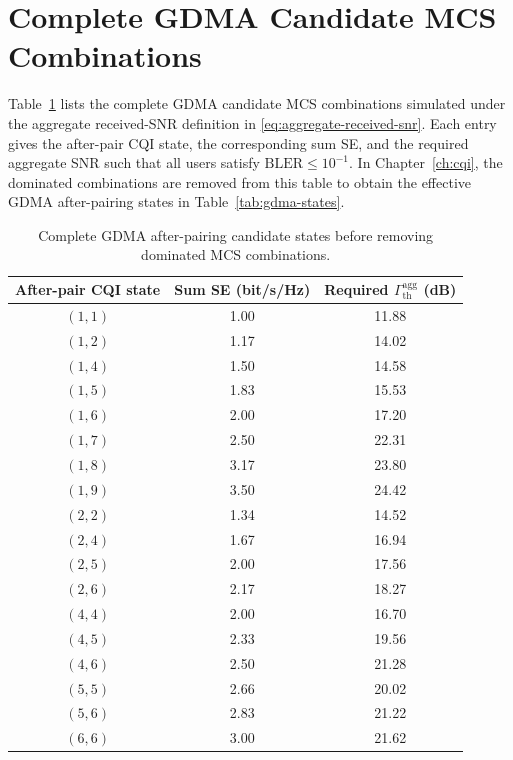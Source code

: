 
\makeatletter
\def\@currentlabel{A}
\makeatother
\label{app:gdma-candidate-table}

\section{Complete GDMA Candidate MCS Combinations}

Table~\ref{tab:appendix-gdma-complete-candidates} lists the complete GDMA candidate MCS combinations simulated under the aggregate received-SNR definition in \eqref{eq:aggregate-received-snr}. Each entry gives the after-pair CQI state, the corresponding sum SE, and the required aggregate SNR such that all users satisfy $\mathrm{BLER}\leq 10^{-1}$. In Chapter~\ref{ch:cqi}, the dominated combinations are removed from this table to obtain the effective GDMA after-pairing states in Table~\ref{tab:gdma-states}.

\begin{table}[t]
\centering
\small
\caption{Complete GDMA after-pairing candidate states before removing dominated MCS combinations.}
\label{tab:appendix-gdma-complete-candidates}
\begin{tabular}{@{}ccc@{}}
\toprule
After-pair CQI state & Sum SE (bit/s/Hz) & Required $\Gamma^{\mathrm{agg}}_{\mathrm{th}}$ (dB) \\
\midrule
$(1,1)$ & 1.00 & 11.88 \\
$(1,2)$ & 1.17 & 14.02 \\
$(1,4)$ & 1.50 & 14.58 \\
$(1,5)$ & 1.83 & 15.53 \\
$(1,6)$ & 2.00 & 17.20 \\
$(1,7)$ & 2.50 & 22.31 \\
$(1,8)$ & 3.17 & 23.80 \\
$(1,9)$ & 3.50 & 24.42 \\
$(2,2)$ & 1.34 & 14.52 \\
$(2,4)$ & 1.67 & 16.94 \\
$(2,5)$ & 2.00 & 17.56 \\
$(2,6)$ & 2.17 & 18.27 \\
$(4,4)$ & 2.00 & 16.70 \\
$(4,5)$ & 2.33 & 19.56 \\
$(4,6)$ & 2.50 & 21.28 \\
$(5,5)$ & 2.66 & 20.02 \\
$(5,6)$ & 2.83 & 21.22 \\
$(6,6)$ & 3.00 & 21.62 \\
\bottomrule
\end{tabular}
\end{table}
